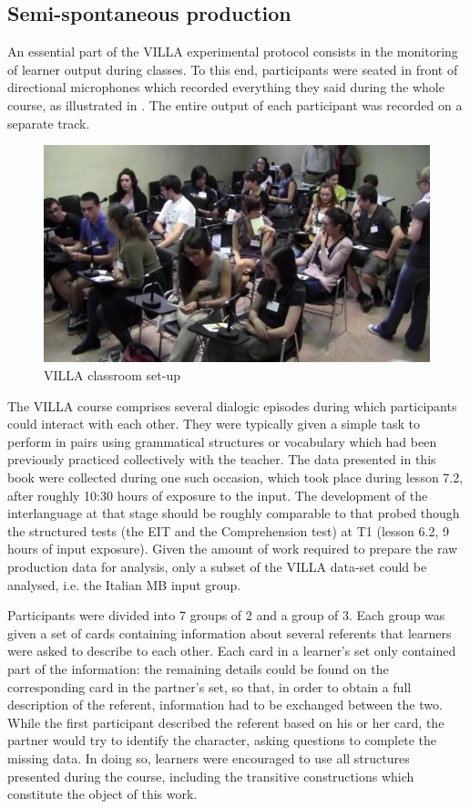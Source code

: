\subsection{Semi-spontaneous production}\label{sec:02:4.5}

An essential part of the VILLA experimental protocol consists in the monitoring of learner output during classes. To this end, participants were seated in front of directional microphones which recorded everything they said during the whole course, as illustrated in . The entire output of each participant was recorded on a separate track.

\begin{figure}
    \includegraphics[width=\textwidth]{figures/02-8.pdf}
    \caption{VILLA classroom set-up}
    \label{fig:02:8}
\end{figure}

The VILLA course comprises several dialogic episodes during which participants could interact with each other. They were typically given a simple task to perform in pairs using grammatical structures or vocabulary which had been previously practiced collectively with the teacher. The data presented in this book were collected during one such occasion, which took place during lesson 7.2, after roughly 10:30 hours of exposure to the input. The development of the interlanguage at that stage should be roughly comparable to that probed though the structured tests (the EIT and the Comprehension test) at T1 (lesson 6.2, 9 hours of input exposure). Given the amount of work required to prepare the raw production data for analysis, only a subset of the VILLA data-set could be analysed, i.e. the Italian MB input group.

Participants were divided into 7 groups of 2 and a group of 3. Each group was given a set of cards containing information about several referents that learners were asked to describe to each other. Each card in a learner's set only contained part of the information: the remaining details could be found on the corresponding card in the partner's set, so that, in order to obtain a full description of the referent, information had to be exchanged between the two. While the first participant described the referent based on his or her card, the partner would try to identify the character, asking questions to complete the missing data. In doing so, learners were encouraged to use all structures presented during the course, including the transitive constructions which constitute the object of this work. 

